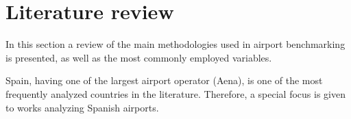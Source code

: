 
\section{Literature review}
\label{sec:backg}
In this section a review of the main methodologies used in airport benchmarking is presented, as well as the most commonly employed variables.

Spain, having one of the largest airport operator (Aena), is one of the most frequently analyzed countries in the literature. Therefore, a special focus is given to works analyzing Spanish airports.

